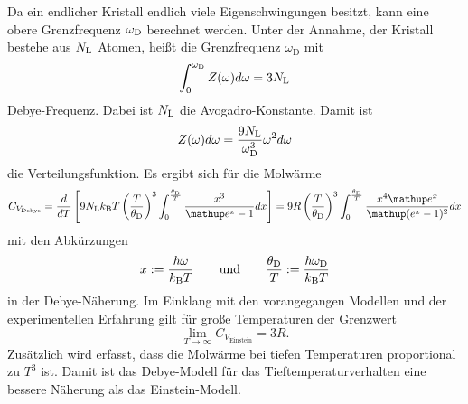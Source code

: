 Da ein endlicher Kristall endlich viele Eigenschwingungen besitzt, kann eine obere Grenzfrequenz $\omega_\text D$ berechnet werden. 
Unter der Annahme, der Kristall bestehe aus $N_\text L$ Atomen, heißt die Grenzfrequenz $\omega_\text{D}$ mit 
\begin{equation}
	\int_0^{\omega_\text D} Z(\omega) d\omega = 3 N_\text L
	\label{eqn:wd}
\end{equation}
Debye-Frequenz. 
Dabei ist $N_\text L$ die Avogadro-Konstante.
Damit ist 
\begin{equation}
	Z(\omega)d\omega = \frac{9 N_\text L}{\omega_\text D ^3}\omega^2 d\omega
	\label{eqn:z2}
\end{equation}
die Verteilungsfunktion.
Es ergibt sich für die Molwärme
\begin{equation}
	C_{V_\text{Debye}} = \frac{d}{dT}\left[9 N_\text L k_\text B T \left(\frac{T}{\theta_\text D}\right)^3 \int_0^{\frac{\theta_\text D}{T}} \frac{x^3}{\mathup e^x -1} dx \right] = 9 R \left(\frac{T}{\theta_\text D}\right)^3 \int_0^{\frac{\theta_\text D}{T}} \frac{x^4\mathup e^x}{\mathup (e^x -1)^2} dx
	\label{eqn:cvd}
\end{equation}
mit den Abkürzungen
\begin{equation*}
	x := \frac{\hbar\omega}{k_\text B T}\qquad\text{und}\qquad \frac{\theta_\text D}{T} :=\frac{\hbar\omega_\text D }{k_\text B T}
\end{equation*}
in der Debye-Näherung.
Im Einklang mit den vorangegangen Modellen und der experimentellen Erfahrung gilt für große Temperaturen der Grenzwert 
\begin{equation}
	\lim_{T\to\infty} C_{V_\text{Einstein}} = 3R.
\end{equation}
Zusätzlich wird erfasst, dass die Molwärme bei tiefen Temperaturen  proportional zu $T^3$ ist. 
Damit ist das Debye-Modell für das Tieftemperaturverhalten eine bessere Näherung als das Einstein-Modell.